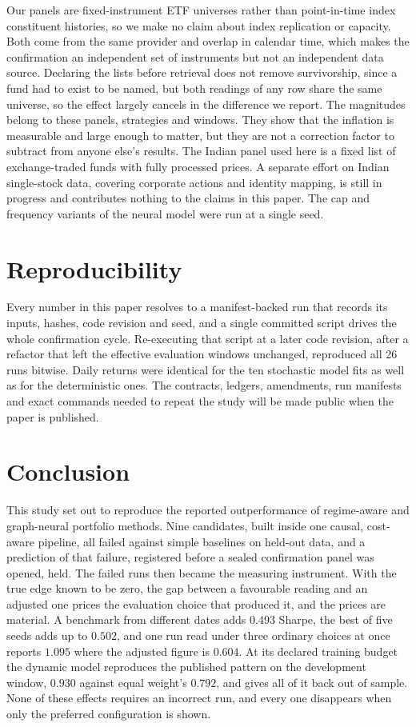 \documentclass[sigconf,nonacm]{acmart}
\begin{document}
Our panels are fixed-instrument ETF universes rather than point-in-time index
constituent histories, so we make no claim about index replication or capacity.
Both come from the same provider and overlap in calendar time, which makes the
confirmation an independent set of instruments but not an independent data
source. Declaring the lists before retrieval does not remove survivorship, since
a fund had to exist to be named, but both readings of any row share the same
universe, so the effect largely cancels in the difference we report. The magnitudes belong to these panels, strategies and windows. They show that
the inflation is measurable and large enough to matter, but they are not a
correction factor to subtract from anyone else's results. The Indian panel used here is a fixed list of exchange-traded funds with fully
processed prices. A separate effort on Indian single-stock data, covering
corporate actions and identity mapping, is still in progress and contributes
nothing to the claims in this paper. The cap and frequency variants of the neural model were
run at a single seed.

\section{Reproducibility}

Every number in this paper resolves to a manifest-backed run that records its
inputs, hashes, code revision and seed, and a single committed script drives the
whole confirmation cycle. Re-executing that script at a later code revision,
after a refactor that left the effective evaluation windows unchanged,
reproduced all 26 runs bitwise. Daily returns were identical for the ten
stochastic model fits as well as for the deterministic ones. The contracts,
ledgers, amendments, run manifests and exact commands needed to repeat the study
will be made public when the paper is published.

\section{Conclusion}

This study set out to reproduce the reported outperformance of regime-aware
and graph-neural portfolio methods. Nine candidates, built inside one causal,
cost-aware pipeline, all failed against simple baselines on held-out data,
and a prediction of that failure, registered before a sealed confirmation panel
was opened, held. The failed runs then became the measuring instrument. With
the true edge known to be zero, the gap between a favourable reading and an
adjusted one prices the evaluation choice that produced it, and the prices are
material. A benchmark from different dates adds $0.493$ Sharpe, the best of
five seeds adds up to $0.502$, and one run read under three ordinary choices at
once reports $1.095$ where the adjusted figure is $0.604$. At its declared
training budget the dynamic model reproduces the published pattern on the
development window, $0.930$ against equal weight's $0.792$, and gives all of it
back out of sample. None of these effects requires an incorrect run, and every
one disappears when only the preferred configuration is shown.
\end{document}
